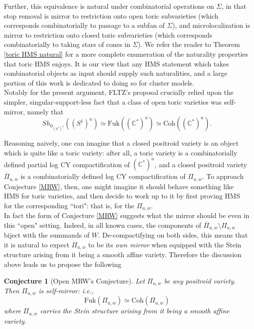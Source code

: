 \documentclass[11pt]{amsart}
\newtheorem{conj}[thm]{Conjecture}
\theoremstyle{definition}
\theoremstyle{remark}
\newcommand{\Coh}{\mathrm{Coh}}
\newcommand{\Fuk}{\mathrm{Fuk}}
\numberwithin{equation}{section}
\begin{document}
Further, this equivalence is natural under combinatorial operations on $\Sigma$, in that stop removal is mirror to restriction onto open toric subvarieties (which corresponds combinatorially to passage to a subfan of $\Sigma$), and microlocalization is mirror to restriction onto closed toric subvarieties (which corresponds combinatorially to taking stars of cones in $\Sigma$). We refer the reader to Theorem \ref{toric HMS natural} for a more complete enumeration of the naturality properties that toric HMS enjoys. It is our view that any HMS statement which takes combinatorial objects as input should supply such naturalities, and a large portion of this work is dedicated to doing so for cluster models.\\

Notably for the present argument, FLTZ's proposal crucially relied upon the simpler, singular-support-less fact that a class of open toric varieties was self-mirror, namely that $$Sh_{0_{(S^1)^n}}((S^1)^n) \simeq \Fuk((\mathbb{C}^*)^n) \simeq \Coh((\mathbb{C}^*)^n).$$

Reasoning naively, one can imagine that a closed positroid variety is an object which is quite like a toric variety: after all, a toric variety is a combinatorially defined partial log CY compactification of $(\mathbb{C}^*)^n$, and a closed positroid variety $\overline{\Pi}_{u,w}$ is a combinatorially defined log CY compactification of $\Pi_{u,w}$. To approach Conjecture \ref{MRW}, then, one might imagine it should behave something like HMS for toric varieties, and then decide to work up to it by first proving HMS for the corresponding ``tori": that is, for the $\Pi_{u,w}$.\\

In fact the form of Conjecture \ref{MRW} suggests what the mirror should be even in this ``open" setting. Indeed, in all known cases, the components of $\overline\Pi_{u,w}\setminus\Pi_{u,w}$ biject with the summands of $W$. De-compactifying on both sides, this means that it is natural to expect $\Pi_{u,w}$ to be its \textit{own mirror} when equipped with the Stein structure arising from it being a smooth affine variety. Therefore the discussion above leads us to propose the following

\begin{conj}[Open MRW's Conjecture]\label{Open MRW}
    Let $\Pi_{u,w}$ be any positroid variety. Then $\Pi_{u,w}$ is self-mirror: i.e., $$\Fuk(\Pi_{u,w}) \simeq \Coh(\Pi_{u,w})$$ \noindent where $\Pi_{u,w}$ carries the Stein structure arising from it being a smooth affine variety.
\end{conj}
\end{document}
